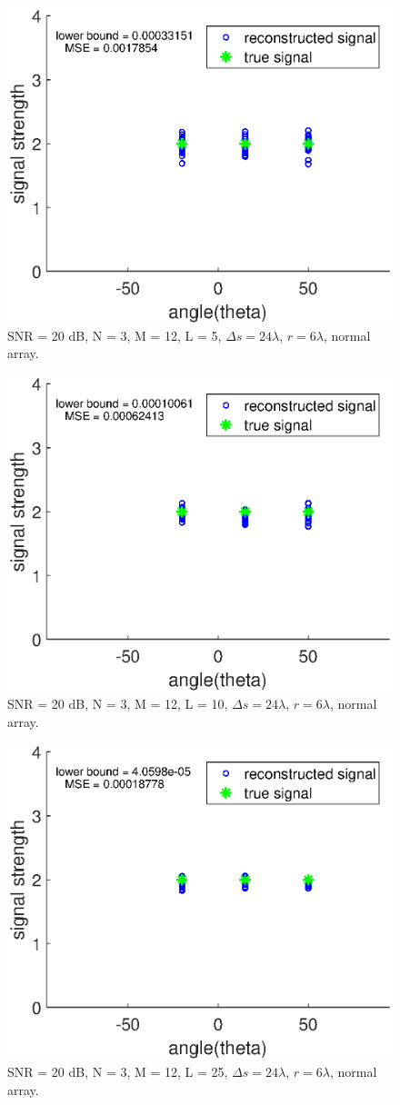 \documentclass[proposal]{umthesis}          %
\begin{document}
\begin{figure}[H]
	\centering
	\includegraphics[width=0.6\columnwidth]{./results/snapshot_effect_5_normal}
	\caption{SNR = 20 dB, N = 3, M = 12, L = 5, $\Delta s = 24 \lambda$, $r = 6\lambda$, normal array.}
	\label{fig:snapshot_effect_5_normal}
\end{figure}

\begin{figure}[H]
	\centering
	\includegraphics[width=0.6\columnwidth]{./results/snapshot_effect_10_normal}
	\caption{SNR = 20 dB, N = 3, M = 12, L = 10, $\Delta s = 24 \lambda$, $r = 6\lambda$, normal array.}
	\label{fig:snapshot_effect_10_normal}
\end{figure}

\begin{figure}[H]
	\centering
	\includegraphics[width=0.6\columnwidth]{./results/snapshot_effect_25_normal}
	\caption{SNR = 20 dB, N = 3, M = 12, L = 25, $\Delta s = 24 \lambda$, $r = 6\lambda$, normal array.}
	\label{fig:snapshot_effect_25_normal}
\end{figure}
\end{document}
